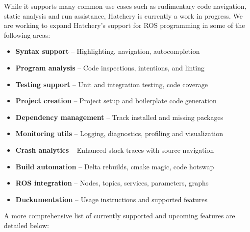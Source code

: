 \documentclass[12pt,initial,twoside,maitrise]{dms}
\numberwithin{equation}{section}
\numberwithin{table}{chapter}
\numberwithin{figure}{chapter}
\begin{document}
\noindent While it supports many common use cases such as rudimentary code navigation, static analysis and run assistance, Hatchery is currently a work in progress. We are working to expand Hatchery's support for ROS programming in some of the following areas:\vspace{10pt}
%
\begin{itemize}
\item \textbf{Syntax support} -- Highlighting, navigation, autocompletion
\item \textbf{Program analysis} -- Code inspections, intentions, and linting
\item \textbf{Testing support} -- Unit and integration testing, code coverage
\item \textbf{Project creation} -- Project setup and boilerplate code generation
\item \textbf{Dependency management} -- Track installed and missing packages
\item \textbf{Monitoring utils} -- Logging, diagnostics, profiling and visualization
\item \textbf{Crash analytics} -- Enhanced stack traces with source navigation
\item \textbf{Build automation} -- Delta rebuilds, cmake magic, code hotswap
\item \textbf{ROS integration} -- Nodes, topics, services, parameters, graphs
\item \textbf{Duckumentation} -- Usage instructions and supported features
\end{itemize}\vspace{10pt}
%
A more comprehensive list of currently supported and upcoming features are detailed below:\vspace{10pt}
%
\end{document}
